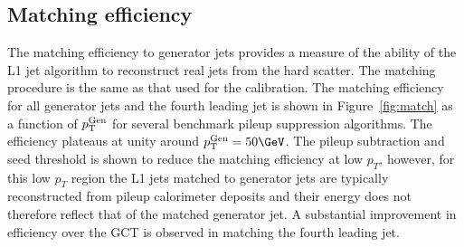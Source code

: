 \subsection{Matching efficiency}

The matching efficiency to generator jets provides a measure of the ability of the L1 jet algorithm 
to reconstruct real jets from the hard scatter. The matching procedure is the same as that used for the calibration. 
The matching efficiency for all generator jets and the fourth leading jet is shown 
in Figure~\ref{fig:match} as a function of ${p_{\text T}^{\text{Gen}}}$ for several benchmark pileup suppression algorithms. 
The efficiency plateaus at unity around $\Genpt=50\GeV$. The pileup subtraction and seed threshold is shown to reduce
the matching efficiency at low $p_T$, however, for this low $p_T$ region the L1 jets matched to generator jets are typically
reconstructed from pileup calorimeter deposits and their energy does not therefore
reflect that of the matched generator jet. A substantial improvement in efficiency over the GCT is observed in 
matching the fourth leading jet.





